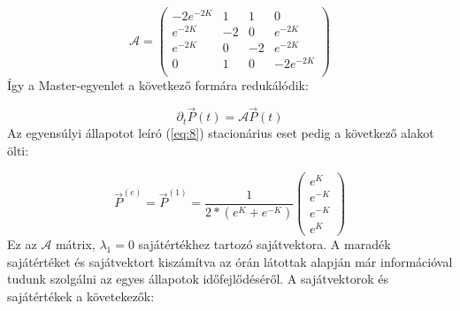 \begin{equation} \label{eq:23}
    \mathcal{A}
    =
    \begin{pmatrix}
        -2 e^{-2 K}  &  1   &  1   &  0            \\
        e^{-2 K}     &  -2  &  0   &  e^{-2 K}     \\
        e^{-2 K}     &  0   &  -2  &  e^{-2 K}     \\
        0            &  1   &  0   &  -2 e^{-2 K}  \\
    \end{pmatrix}
\end{equation}
Így a Master-egyenlet a következő formára redukálódik:

\begin{equation} \label{eq:24}
    \partial_{t} \vec{P} \left( t \right)
    =
    \mathcal{A} \vec{P} \left( t \right)
\end{equation}
Az egyensúlyi állapotot leíró (\ref{eq:8}) stacionárius eset pedig a következő alakot ölti:

\begin{equation} \label{eq:25}
    \vec{P}^{\left( e \right)}
    =
    \vec{P}^{\left( 1 \right)}
    =
    \frac{1}{2 * \left( e^{K} + e^{-K} \right)}
    \begin{pmatrix}
        e^{K} \\
        e^{-K} \\
        e^{-K} \\
        e^{K}
    \end{pmatrix}
\end{equation}
Ez az $\mathcal{A}$ mátrix, $\lambda_{1} = 0$ sajátértékhez tartozó sajátvektora. A maradék sajátértéket és sajátvektort kiszámítva az órán látottak alapján már információval tudunk szolgálni az egyes állapotok időfejlődéséről. A sajátvektorok és sajátértékek a követekezők:

